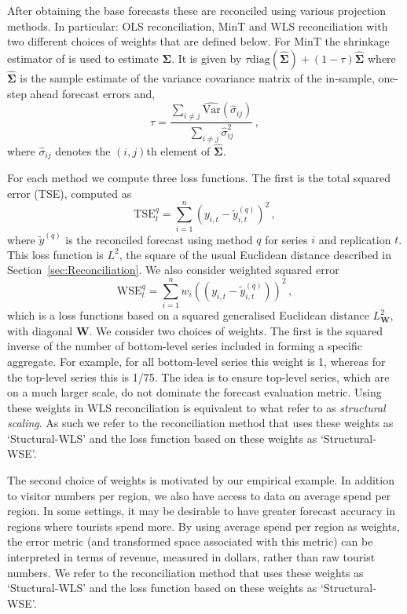 \documentclass[12pt]{article}
\def\var{\text{Var}}
\theoremstyle{definition}
\begin{document}
After obtaining the base forecasts these are reconciled using various projection methods. In particular: OLS reconciliation, MinT and WLS reconciliation with two different choices of weights that are defined below.  For MinT the shrinkage estimator of \cite{Schafer2005} is used to estimate  $\bm{\Sigma}$. It is given by $\tau\text{diag}(\hat{\bm{\Sigma}}) + (1-\tau)\hat{\bm{\Sigma}}$  where $\hat{\bm{\Sigma}}$ is the sample estimate of the variance covariance matrix of the in-sample, one-step ahead forecast errors and,
	\begin{equation*}
	\tau = \frac{\sum_{i \neq j}\hat{\var}(\hat{\sigma}_{ij})}{\sum_{i \neq j}{\hat{\sigma}}^2_{ij}}\,,
	\end{equation*}
	where $\hat{\sigma}_{ij}$ denotes the $(i,j)$th element of $\hat{\bm{\Sigma}}$. 

{\color{blue} For each method we compute three loss functions.  The first is the total squared error (TSE), computed as
	\begin{equation}
	\label{eq:tse}
	\textrm{TSE}^{q}_t=\sum\limits_{i=1}^n(y_{i,t}-\tilde{y}^{(q)}_{i,t})^2\,,
	\end{equation}
	where $\tilde{y}^{(q)}$ is the reconciled forecast using method $q$ for series $i$ and replication $t$.
This loss function is $L^2$, the square of the usual Euclidean distance described in Section~\ref{sec:Reconciliation}. We also consider weighted squared error
\begin{equation*}
	\textrm{WSE}^{q}_t=\sum\limits_{i=1}^n w_i\left( (y_{i,t}-\tilde{y}^{(q)}_{i,t})\right)^2\,,
	\end{equation*}
	which is a loss functions based on a squared generalised Euclidean distance $L_{\bm{W}}^2$, with diagonal $\bm{W}$.  We consider two choices of weights.  The first is the squared inverse of the number of bottom-level series included in forming a specific aggregate.  For example, for all bottom-level series this weight is 1, whereas for the top-level series this is 1/75.  The idea is to ensure top-level series, which are on a much larger scale, do not dominate the forecast evaluation metric.  Using these weights in WLS reconciliation is equivalent to what \cite{AthEtAl2017} refer to as \textit{structural scaling}.  As such we refer to the reconciliation method that uses these weights as `Stuctural-WLS' and the loss function based on these weights as `Structural-WSE'.
	
	The second choice of weights is motivated by our empirical example.  In addition to visitor numbers per region, we also have access to data on average spend per region.  In some settings, it may be desirable to have greater forecast accuracy in regions where tourists spend more.  By using average spend per region as weights, the error metric (and transformed space associated with this metric) can be interpreted in terms of revenue, measured in dollars, rather than raw tourist numbers.  We refer to the reconciliation method that uses these weights as `Stuctural-WLS' and the loss function based on these weights as `Structural-WSE'.
}
\end{document}
